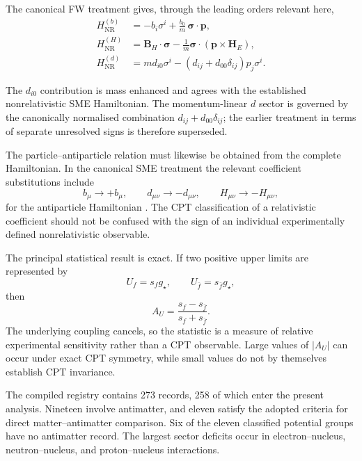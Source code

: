 \documentclass[aps,prd,reprint,superscriptaddress,nofootinbib]{revtex4-2}
\newcommand{\NR}{\mathrm{NR}}
\begin{document}
	The canonical FW treatment gives, through the leading orders relevant
	here,
	\begin{align}
		H_{\NR}^{(b)}
		&=
		-b_i\sigma^i
		+\frac{b_0}{m}\,
		\boldsymbol{\sigma}\cdot\mathbf p,
		\label{eq:summaryb}
		\\
		H_{\NR}^{(H)}
		&=
		\mathbf B_H\cdot\boldsymbol{\sigma}
		-\frac{1}{m}
		\boldsymbol{\sigma}\cdot
		(\mathbf p\times\mathbf H_E),
		\label{eq:summaryH}
		\\
		H_{\NR}^{(d)}
		&=
		m d_{i0}\sigma^i
		-
		(d_{ij}+d_{00}\delta_{ij})p_j\sigma^i .
		\label{eq:summaryd}
	\end{align}
	
	The $d_{i0}$ contribution is mass enhanced and agrees with the
	established nonrelativistic SME Hamiltonian. The momentum-linear
	$d$ sector is governed by the canonically normalised combination
	$d_{ij}+d_{00}\delta_{ij}$; the earlier treatment in terms of separate
	unresolved signs is therefore superseded.
	
	The particle--antiparticle relation must likewise be obtained from the
	complete Hamiltonian. In the canonical SME treatment the relevant
	coefficient substitutions include
	\begin{equation}
		b_\mu\rightarrow+b_\mu,
		\qquad
		d_{\mu\nu}\rightarrow-d_{\mu\nu},
		\qquad
		H_{\mu\nu}\rightarrow-H_{\mu\nu},
	\end{equation}
	for the antiparticle Hamiltonian \cite{KosteleckyLane1999}. The CPT
	classification of a relativistic coefficient should not be confused
	with the sign of an individual experimentally defined nonrelativistic
	observable.
	
	The principal statistical result is exact. If two positive upper
	limits are represented by
	\begin{equation}
		U_f=s_f g_\star,
		\qquad
		U_{\bar f}=s_{\bar f}g_\star,
	\end{equation}
	then
	\begin{equation}
		A_U
		=
		\frac{s_f-s_{\bar f}}
		{s_f+s_{\bar f}}.
	\end{equation}
	The underlying coupling cancels, so the statistic is a measure of
	relative experimental sensitivity rather than a CPT observable.
	Large values of $|A_U|$ can occur under exact CPT symmetry, while
	small values do not by themselves establish CPT invariance.
	
	The compiled registry contains 273 records, 258 of which enter the
	present analysis. Nineteen involve antimatter, and eleven satisfy the
	adopted criteria for direct matter--antimatter comparison. Six of the
	eleven classified potential groups have no antimatter record. The
	largest sector deficits occur in electron--nucleus, neutron--nucleus,
	and proton--nucleus interactions.
	
\end{document}
